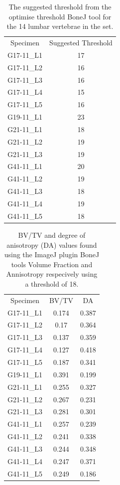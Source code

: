 \begin{table}[ht!]
	\caption{The suggested threshold from the optimise threshold BoneJ tool for
    the 14 lumbar vertebrae in the set.}
	\label{tab:th_bv_tv}
	\centering
	\begin{tabular}{c|c}
    Specimen    & Suggested Threshold   \\
G17-11\_L1 & 17 \\
G17-11\_L2 & 16\\
G17-11\_L3 & 16\\
G17-11\_L4 & 15\\
G17-11\_L5 & 16\\
G19-11\_L1 & 23\\
G21-11\_L1 & 18\\
G21-11\_L2 & 19\\
G21-11\_L3 & 19\\
G41-11\_L1 & 20\\
G41-11\_L2 & 19\\
G41-11\_L3 & 18\\
G41-11\_L4 & 19\\
G41-11\_L5 & 18\\
	\hline
	\end{tabular}
\end{table}

\begin{table}[ht!]
	\caption{BV/TV and degree of anisotropy (DA) values found using the ImageJ
    plugin BoneJ tools Volume Fraction and Annisotropy respecively using a
    threshold of 18.}
	\label{tab:th_bv_tv}
	\centering
	\begin{tabular}{c|c|c}
    Specimen                       & BV/TV & DA\\
G17-11\_L1  & 0.174 & 0.387 \\
G17-11\_L2  & 0.17  & 0.364\\
G17-11\_L3  & 0.137 & 0.359\\
G17-11\_L4  & 0.127 & 0.418\\
G17-11\_L5  & 0.187 & 0.341\\
G19-11\_L1  & 0.391 & 0.199\\
G21-11\_L1  & 0.255 & 0.327\\
G21-11\_L2  & 0.267 & 0.231\\
G21-11\_L3  & 0.281 & 0.301\\
G41-11\_L1  & 0.257 & 0.239\\
G41-11\_L2  & 0.241 & 0.338\\
G41-11\_L3  & 0.244 & 0.348\\
G41-11\_L4  & 0.247 & 0.371\\
G41-11\_L5  & 0.249 & 0.186\\
	\hline
	\end{tabular}
\end{table}


